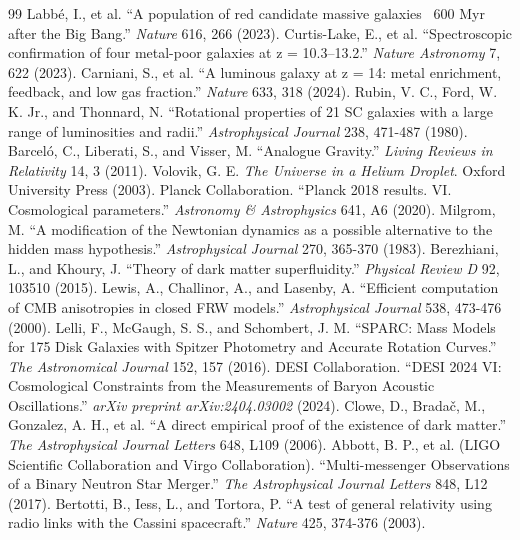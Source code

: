 \documentclass[aps,prd,10pt,onecolumn,superscriptaddress,nofootinbib]{revtex4-2}
\begin{document}
\begin{thebibliography}{99}
 Labbé, I., et al. ``A population of red candidate massive galaxies ~600 Myr after the Big Bang.'' \textit{Nature} 616, 266 (2023).
 Curtis-Lake, E., et al. ``Spectroscopic confirmation of four metal-poor galaxies at z = 10.3–13.2.'' \textit{Nature Astronomy} 7, 622 (2023).
 Carniani, S., et al. ``A luminous galaxy at z = 14: metal enrichment, feedback, and low gas fraction.'' \textit{Nature} 633, 318 (2024).
 Rubin, V. C., Ford, W. K. Jr., and Thonnard, N. ``Rotational properties of 21 SC galaxies with a large range of luminosities and radii.'' \textit{Astrophysical Journal} 238, 471-487 (1980).
 Barceló, C., Liberati, S., and Visser, M. ``Analogue Gravity.'' \textit{Living Reviews in Relativity} 14, 3 (2011).
 Volovik, G. E. \textit{The Universe in a Helium Droplet}. Oxford University Press (2003).
 Planck Collaboration. ``Planck 2018 results. VI. Cosmological parameters.'' \textit{Astronomy \& Astrophysics} 641, A6 (2020).
 Milgrom, M. ``A modification of the Newtonian dynamics as a possible alternative to the hidden mass hypothesis.'' \textit{Astrophysical Journal} 270, 365-370 (1983).
 Berezhiani, L., and Khoury, J. ``Theory of dark matter superfluidity.'' \textit{Physical Review D} 92, 103510 (2015).
 Lewis, A., Challinor, A., and Lasenby, A. ``Efficient computation of CMB anisotropies in closed FRW models.'' \textit{Astrophysical Journal} 538, 473-476 (2000).
 Lelli, F., McGaugh, S. S., and Schombert, J. M. ``SPARC: Mass Models for 175 Disk Galaxies with Spitzer Photometry and Accurate Rotation Curves.'' \textit{The Astronomical Journal} 152, 157 (2016).
 DESI Collaboration. ``DESI 2024 VI: Cosmological Constraints from the Measurements of Baryon Acoustic Oscillations.'' \textit{arXiv preprint arXiv:2404.03002} (2024).
 Clowe, D., Bradač, M., Gonzalez, A. H., et al. ``A direct empirical proof of the existence of dark matter.'' \textit{The Astrophysical Journal Letters} 648, L109 (2006).
 Abbott, B. P., et al. (LIGO Scientific Collaboration and Virgo Collaboration). ``Multi-messenger Observations of a Binary Neutron Star Merger.'' \textit{The Astrophysical Journal Letters} 848, L12 (2017).
 Bertotti, B., Iess, L., and Tortora, P. ``A test of general relativity using radio links with the Cassini spacecraft.'' \textit{Nature} 425, 374-376 (2003).

\end{thebibliography}
\end{document}
